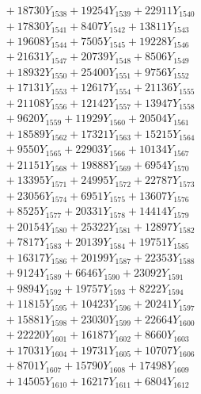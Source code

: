 \documentclass[a4paper,10pt]{article}
\begin{document}
{\begin{align}
&\;  + 18730 Y_{1538} + 19254 Y_{1539} + 22911 Y_{1540} \\[0.3ex]
&\;  + 17830 Y_{1541} + 8407 Y_{1542} + 13811 Y_{1543} \\[0.3ex]
&\;  + 19608 Y_{1544} + 7505 Y_{1545} + 19228 Y_{1546} \\[0.3ex]
&\;  + 21631 Y_{1547} + 20739 Y_{1548} + 8506 Y_{1549} \\[0.3ex]
&\;  + 18932 Y_{1550} + 25400 Y_{1551} + 9756 Y_{1552} \\[0.3ex]
&\;  + 17131 Y_{1553} + 12617 Y_{1554} + 21136 Y_{1555} \\[0.3ex]
&\;  + 21108 Y_{1556} + 12142 Y_{1557} + 13947 Y_{1558} \\[0.5ex]\allowbreak
&\;  + 9620 Y_{1559} + 11929 Y_{1560} + 20504 Y_{1561} \\[0.3ex]
&\;  + 18589 Y_{1562} + 17321 Y_{1563} + 15215 Y_{1564} \\[0.3ex]
&\;  + 9550 Y_{1565} + 22903 Y_{1566} + 10134 Y_{1567} \\[0.3ex]
&\;  + 21151 Y_{1568} + 19888 Y_{1569} + 6954 Y_{1570} \\[0.3ex]
&\;  + 13395 Y_{1571} + 24995 Y_{1572} + 22787 Y_{1573} \\[0.3ex]
&\;  + 23056 Y_{1574} + 6951 Y_{1575} + 13607 Y_{1576} \\[0.3ex]
&\;  + 8525 Y_{1577} + 20331 Y_{1578} + 14414 Y_{1579} \\[0.3ex]
&\;  + 20154 Y_{1580} + 25322 Y_{1581} + 12897 Y_{1582} \\[0.3ex]
&\;  + 7817 Y_{1583} + 20139 Y_{1584} + 19751 Y_{1585} \\[0.3ex]
&\;  + 16317 Y_{1586} + 20199 Y_{1587} + 22353 Y_{1588} \\[0.5ex]\allowbreak
&\;  + 9124 Y_{1589} + 6646 Y_{1590} + 23092 Y_{1591} \\[0.3ex]
&\;  + 9894 Y_{1592} + 19757 Y_{1593} + 8222 Y_{1594} \\[0.3ex]
&\;  + 11815 Y_{1595} + 10423 Y_{1596} + 20241 Y_{1597} \\[0.3ex]
&\;  + 15881 Y_{1598} + 23030 Y_{1599} + 22664 Y_{1600} \\[0.3ex]
&\;  + 22220 Y_{1601} + 16187 Y_{1602} + 8660 Y_{1603} \\[0.3ex]
&\;  + 17031 Y_{1604} + 19731 Y_{1605} + 10707 Y_{1606} \\[0.3ex]
&\;  + 8701 Y_{1607} + 15790 Y_{1608} + 17498 Y_{1609} \\[0.3ex]
&\;  + 14505 Y_{1610} + 16217 Y_{1611} + 6804 Y_{1612} \\[0.3ex]

\end{align}}
\end{document}
